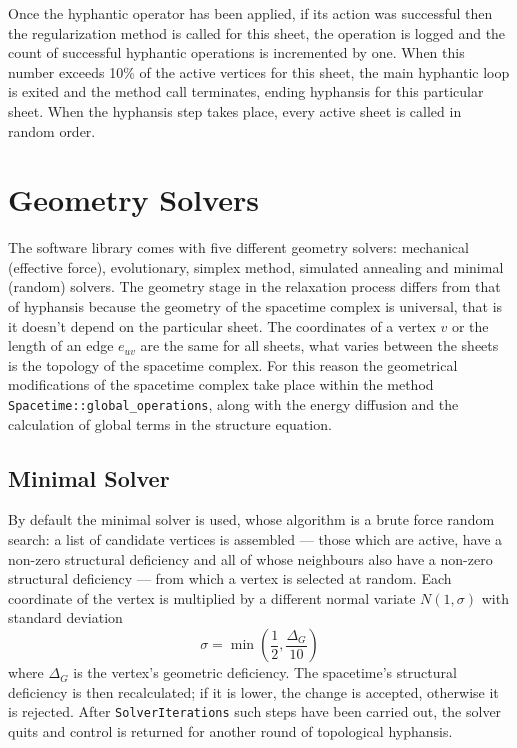 \documentclass[12pt,letterpaper]{report}
\begin{document}
Once the hyphantic operator has been applied, if its action was successful then the regularization method 
is called for this sheet, the operation is logged and the count of successful hyphantic operations is 
incremented by one. When this number exceeds 10\% of the active vertices for this sheet, the main hyphantic 
loop is exited and the method call terminates, ending hyphansis for this particular sheet. When the 
hyphansis step takes place, every active sheet is called in random order.  
  
\chapter{Geometry Solvers}

The software library comes with five different geometry solvers: mechanical (effective force), 
evolutionary, simplex method, simulated annealing and minimal (random) solvers. The geometry stage in 
the relaxation process differs from that of hyphansis because the geometry of the spacetime complex is 
universal, that is it doesn't depend on the particular sheet. The coordinates of a vertex $v$ or the 
length of an edge $e_{uv}$ are the same for all sheets, what varies between the sheets is the topology 
of the spacetime complex. For this reason the geometrical modifications of the spacetime complex take 
place within the method \texttt{Spacetime::global\_operations}, along with the energy diffusion and the 
calculation of global terms in the structure equation. 

\section{Minimal Solver}

By default the minimal solver is used, whose algorithm is a brute force random search: 
a list of candidate vertices is assembled --- those which are active, have a non-zero 
structural deficiency and all of whose neighbours also have a non-zero structural 
deficiency --- from which a vertex is selected at random. Each coordinate of the vertex 
is multiplied by a different normal variate $N(1,\sigma)$ with standard deviation
\begin{equation*} 
\sigma = \min\left(\frac {1}{2},\frac{\Delta_G}{10}\right)
\end{equation*}
where $\Delta_G$ is the vertex's geometric deficiency. The spacetime's structural deficiency 
is then recalculated; if it is lower, the change is accepted, otherwise it is rejected. After 
\texttt{SolverIterations} such steps have been carried out, the solver quits and control is 
returned for another round of topological hyphansis.  
\end{document}
